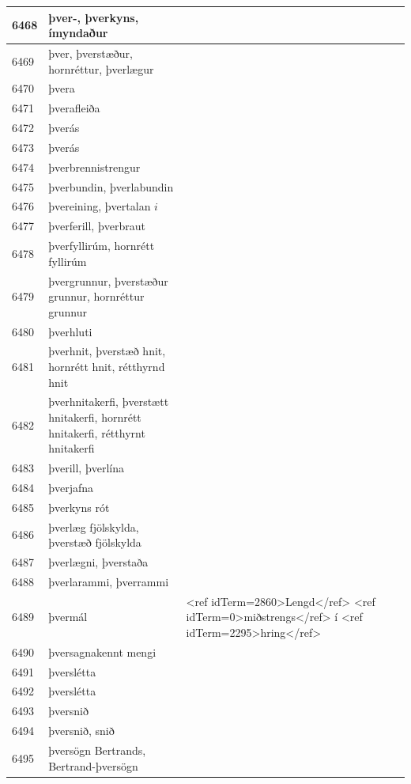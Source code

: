 \begin{longtable}{p{}|p{}|p{}|p{}|p{}}
\hline
6468 & þver-, þverkyns, ímyndaður &  &  &  \\
\hline
6469 & þver, þverstæður, hornréttur, þverlægur &  &  &  \\
\hline
6470 & þvera &  &  &  \\
\hline
6471 & þverafleiða &  &  &  \\
\hline
6472 & þverás &  &  &  \\
\hline
6473 & þverás &  &  & \\
\hline
6474 & þverbrennistrengur &  &  &  \\
\hline
6475 & þverbundin, þverlabundin &  &  &  \\
\hline
6476 & þvereining, þvertalan \(i\) &  &  &  \\
\hline
6477 & þverferill, þverbraut &  &  &  \\
\hline
6478 & þverfyllirúm, hornrétt fyllirúm &  &  &  \\
\hline
6479 & þvergrunnur, þverstæður grunnur, hornréttur grunnur &  &  &  \\
\hline
6480 & þverhluti &  &  &  \\
\hline
6481 & þverhnit, þverstæð hnit, hornrétt hnit, rétthyrnd hnit &  &  &  \\
\hline
6482 & þverhnitakerfi, þverstætt hnitakerfi, hornrétt hnitakerfi, rétthyrnt hnitakerfi &  &  &  \\
\hline
6483 & þverill, þverlína &  &  & \\
\hline
6484 & þverjafna &  &  &  \\
\hline
6485 & þverkyns rót &  &  &  \\
\hline
6486 & þverlæg fjölskylda, þverstæð fjölskylda &  &  &  \\
\hline
6487 & þverlægni, þverstaða &  &  &  \\
\hline
6488 & þverlarammi, þverrammi &  &  &  \\
\hline
6489 & þvermál & <ref idTerm=2860>Lengd</ref> <ref idTerm=0>miðstrengs</ref> í <ref idTerm=2295>hring</ref> &  & \\
\hline
6490 & þversagnakennt mengi &  &  &  \\
\hline
6491 & þverslétta &  &  &  \\
\hline
6492 & þverslétta &  &  &  \\
\hline
6493 & þversnið &  &  &  \\
\hline
6494 & þversnið, snið &  &  &  \\
\hline
6495 & þversögn Bertrands, Bertrand-þversögn &  &  &  \\
\hline

\end{longtable}
